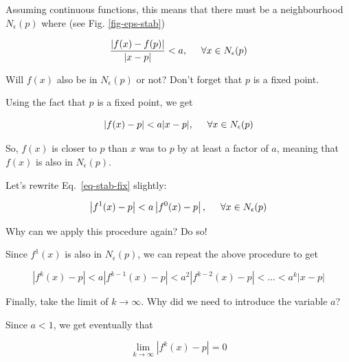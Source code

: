 Assuming continuous functions, this means that there must be a neighbourhood $N_\epsilon(p)$ where (see Fig. \ref{fig-eps-stab})

\begin{equation}
\frac{\left|f(x)-f(p)\right|}{|x-p|} < a, \hspace{.5cm} \forall x \in N_\epsilon(p)
\end{equation}

\begin{cue}
Will $f(x)$ also be in $N_\epsilon(p)$ or not? Don't forget that $p$ is a fixed point. 
\end{cue}

Using the fact that $p$ is a fixed point, we get

\begin{equation}
\left|f(x)-p\right| < a |x-p|,  \hspace{.5cm} \forall x \in N_\epsilon(p) \label{eq-stab-fix}
\end{equation}

So, $f(x)$ is closer to $p$ than $x$ was to $p$ by at least a factor of $a$, meaning that $f(x)$ is also in $N_\epsilon(p)$.

Let's rewrite Eq.~\ref{eq-stab-fix} slightly:

\begin{equation}
\left|f^1(x)-p\right| < a \left|f^0(x)-p\right|,  \hspace{.5cm} \forall x \in N_\epsilon(p)
\end{equation} 

\begin{cue}
Why can we apply this procedure again? Do so!  
\end{cue}

Since $f^1(x)$ is also in $N_\epsilon(p)$, we can repeat the above procedure to get

\begin{equation}
\left|f^k(x)-p\right| < a\left|f^{k-1}(x)-p\right| < a^2\left|f^{k-2}(x)-p\right|< ... < a^k |x-p| 
\end{equation}  

\begin{cue}
Finally, take the limit of $k \to \infty$. Why did we need to introduce the variable $a$?
\end{cue}

Since $a<1$, we get eventually that

\begin{equation}
\lim_{k \to \infty} \left|f^k(x)-p\right| = 0
\end{equation} 

